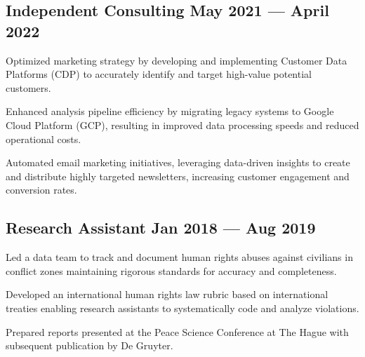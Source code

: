 \documentclass[singlesided, paper=a4, fontsize=10.5pt]{testing-class}
\begin{document}
{\begin{zitemize}
    \end{zitemize}

    \subsection{Independent Consulting \hfill May 2021 --- April 2022}
    \begin{zitemize}
        \item Optimized marketing strategy by developing and implementing Customer Data Platforms (CDP) to accurately identify and target high-value potential customers.
        \item Enhanced analysis pipeline efficiency by migrating legacy systems to Google Cloud Platform (GCP), resulting in improved data processing speeds and reduced operational costs.
        \item Automated email marketing initiatives, leveraging data-driven insights to create and distribute highly targeted newsletters, increasing customer engagement and conversion rates.
    \end{zitemize}

    \subsection{Research Assistant \hfill Jan 2018 --- Aug 2019}
    \begin{zitemize}
        \item Led a data team to track and document human rights abuses against civilians in conflict zones maintaining rigorous standards for accuracy and completeness.
        \item Developed an international human rights law rubric based on international treaties enabling research assistants to systematically code and analyze violations.
        \item Prepared reports presented at the Peace Science Conference at The Hague with subsequent publication by De Gruyter.
    \end{zitemize}




}
\end{document}
